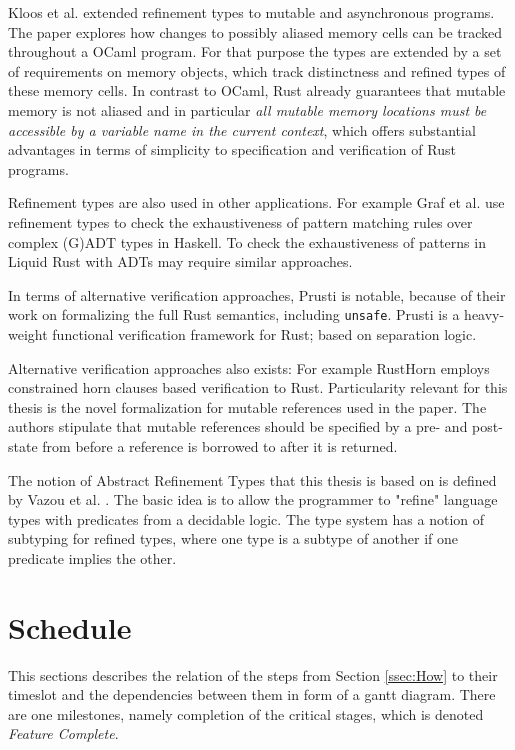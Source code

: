 \documentclass[11pt]{article}
\newcommand{\code}[1]{\texttt{#1}}
\begin{document}
Kloos et al. \cite{kloos_asynchronous_2015} extended refinement types to mutable and asynchronous programs. The paper explores how changes to possibly aliased memory cells can be tracked throughout a OCaml program. For that purpose the types are extended by a set of requirements on memory objects, which track distinctness and refined types of these memory cells. In contrast to OCaml, Rust already guarantees that mutable memory is not aliased and in particular \textit{all mutable memory locations must be accessible by a variable name in the current context}, which offers substantial advantages in terms of simplicity to specification and verification of Rust programs.

Refinement types are also used in other applications. For example Graf et al. \cite{graf_lower_2020} use refinement types to check the exhaustiveness of pattern matching rules over complex (G)ADT types in Haskell. To check the exhaustiveness of patterns in Liquid Rust with ADTs may require similar approaches.

In terms of alternative verification approaches, Prusti\cite{astrauskas_leveraging_2019} is notable, because of their work on formalizing the full Rust semantics, including \code{unsafe}. Prusti is a heavy-weight functional verification framework for Rust; based on separation logic.

Alternative verification approaches also exists: For example RustHorn\cite{matsushita_rusthorn_2020} employs constrained horn clauses based verification to Rust. Particularity relevant for this thesis is the novel formalization for mutable references used in the paper. The authors stipulate that mutable references should be specified by a pre- and post-state from before a reference is borrowed to after it is returned.

The notion of Abstract Refinement Types that this thesis is based on is defined by Vazou et al. \cite{vazou_abstract_2013}. The basic idea is to allow the programmer to "refine" language types with predicates from a decidable logic. The type system has a notion of subtyping for refined types, where one type is a subtype of another if one predicate implies the other.

\section{Schedule} \label{sec:schedule}

This sections describes the relation of the steps from Section \ref{ssec:How} to their timeslot and the dependencies between them in form of a gantt diagram. There are one milestones, namely completion of the critical stages, which is denoted \textit{Feature Complete}.
\end{document}

